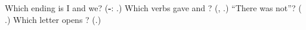 \begin{tcolorbox}[breakable,colback=teal!4,colframe=teal!35!black,title={Before you move on}]
Which ending is I and we? (\textbf{-}: \textbf{}.) Which verbs gave \textbf{} and \textbf{}? (\textbf{}, \textbf{}.) \textquotedblleft{}There was not\textquotedblright{}? (\textbf{ }.) Which letter opens \textbf{}? (\textbf{}.)
\end{tcolorbox}
